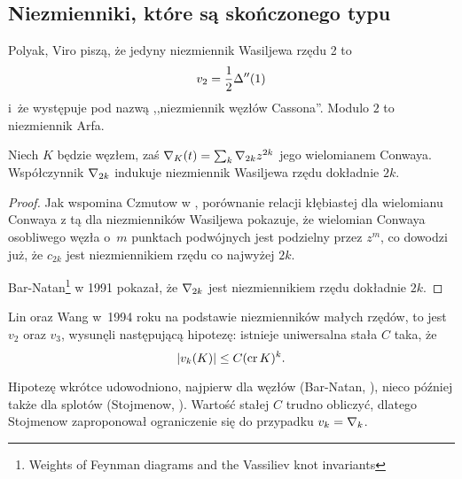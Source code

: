 
\subsection{Niezmienniki, które są skończonego typu}

Polyak, Viro \cite{polyak01} piszą, że jedyny niezmiennik Wasiljewa rzędu 2 to
%
%
\begin{equation}
    v_2 = \frac 12 \Delta''(1)
\end{equation}
i~że występuje pod nazwą ,,niezmiennik węzłów Cassona''.
%
Modulo $2$ to niezmiennik Arfa.
%

\begin{example}
%
    Niech $K$ będzie węzłem, zaś $\nabla_K(t) = \sum_k \nabla_{2k} z^{2k}$ jego wielomianem Conwaya.
    Współczynnik $\nabla_{2k}$ indukuje niezmiennik Wasiljewa rzędu dokładnie $2k$.
\end{example}

\begin{proof}
%
%
    Jak wspomina Czmutow w \cite{chmutov12}, porównanie relacji kłębiastej dla wielomianu Conwaya z tą dla niezmienników Wasiljewa pokazuje, że wielomian Conwaya osobliwego węzła o~$m$ punktach podwójnych jest podzielny przez $z^m$, co dowodzi już, że $c_{2k}$ jest niezmiennikiem rzędu co najwyżej $2k$.

    Bar-Natan\footnote{Weights of Feynman diagrams and the Vassiliev knot invariants} w 1991 pokazał, że $\nabla_{2k}$ jest niezmiennikiem rzędu dokładnie $2k$.
\end{proof}

Lin oraz Wang \cite{wang96} w~1994 roku na podstawie niezmienników małych rzędów, to jest $v_2$ oraz $v_3$, wysunęli następującą hipotezę: istnieje uniwersalna stała $C$ taka, że
%
%
%
\begin{equation}
    |v_k(K)| \le C (\operatorname{cr} K)^k.
\end{equation}

Hipotezę wkrótce udowodniono, najpierw dla węzłów (Bar-Natan, \cite{barnatan95}), nieco później także dla splotów (Stojmenow, \cite{stoimenow001}).
%
%
Wartość stałej $C$ trudno obliczyć, dlatego Stojmenow \cite[problem 1.17]{ohtsuki02} zaproponował ograniczenie się do przypadku $v_k = \nabla_k$.

